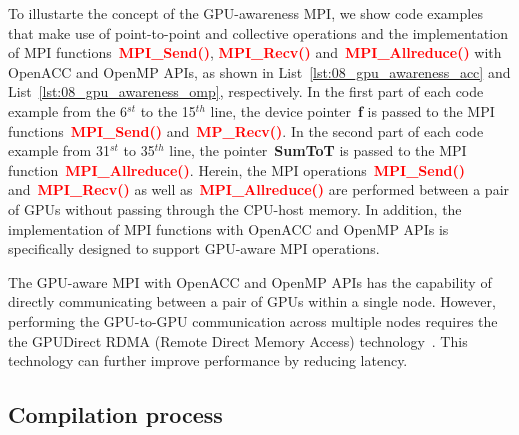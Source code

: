 \par
To illustarte the concept of the GPU-awareness MPI, we show code examples that make use of point-to-point and collective operations and the implementation of MPI functions~\textbf{\textcolor{red}{MPI\_Send()}}, \textbf{\textcolor{red}{MPI\_Recv()}} and~\textbf{\textcolor{red}{MPI\_Allreduce()}} with OpenACC and OpenMP APIs, as shown in List~\ref{lst:08_gpu_awareness_acc} and List~\ref{lst:08_gpu_awareness_omp}, respectively.
In the first part of each code example from the 6$^{st}$ to the 15$^{th}$ line, the device pointer~\textbf{f} is passed to the MPI functions~\textbf{\textcolor{red}{MPI\_Send()}} and~\textbf{\textcolor{red}{MP\_Recv()}}.
In the second part of each code example from 31$^{st}$ to 35$^{th}$ line, the pointer~\textbf{SumToT} is passed to the MPI function~\textbf{\textcolor{red}{MPI\_Allreduce()}}.
Herein, the MPI operations~\textbf{\textcolor{red}{MPI\_Send()}} and~\textbf{\textcolor{red}{MPI\_Recv()}} as well as~\textbf{\textcolor{red}{MPI\_Allreduce()}} are performed between a pair of GPUs without passing through the CPU-host memory.
In addition, the implementation of MPI functions with OpenACC and OpenMP APIs is specifically designed to support GPU-aware MPI operations.








\par
The GPU-aware MPI with OpenACC and OpenMP APIs has the capability of directly communicating between a pair of GPUs within a single node.
However, performing the GPU-to-GPU communication across multiple nodes requires the the GPUDirect RDMA (Remote Direct Memory Access) technology~\cite{gpudirect-rdma}.
This technology can further improve performance by reducing latency.




\subsection{Compilation process}


